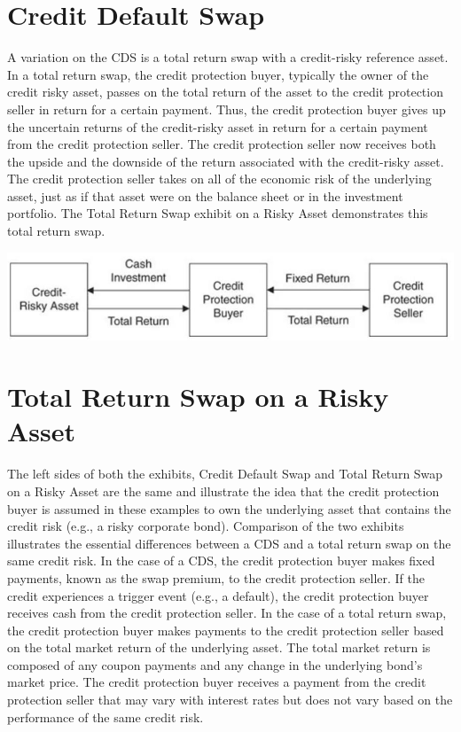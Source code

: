 \documentclass[11pt]{article}
\begin{document}
\section*{Credit Default Swap}
A variation on the CDS is a total return swap with a credit-risky reference asset. In a total return swap, the credit protection buyer, typically the owner of the credit risky asset, passes on the total return of the asset to the credit protection seller in return for a certain payment. Thus, the credit protection buyer gives up the uncertain returns of the credit-risky asset in return for a certain payment from the credit protection seller. The credit protection seller now receives both the upside and the downside of the return associated with the credit-risky asset. The credit protection seller takes on all of the economic risk of the underlying asset, just as if that asset were on the balance sheet or in the investment portfolio. The Total Return Swap exhibit on a Risky Asset demonstrates this total return swap.

\begin{center}
\includegraphics[max width=\textwidth]{2024_04_09_87c8b6247d8feabc3893g-2}
\end{center}

\section*{Total Return Swap on a Risky Asset}
The left sides of both the exhibits, Credit Default Swap and Total Return Swap on a Risky Asset are the same and illustrate the idea that the credit protection buyer is assumed in these examples to own the underlying asset that contains the credit risk (e.g., a risky corporate bond). Comparison of the two exhibits illustrates the essential differences between a CDS and a total return swap on the same credit risk. In the case of a CDS, the credit protection buyer makes fixed payments, known as the swap premium, to the credit protection seller. If the credit experiences a trigger event (e.g., a default), the credit protection buyer receives cash from the credit protection seller. In the case of a total return swap, the credit protection buyer makes payments to the credit protection seller based on the total market return of the underlying asset. The total market return is composed of any coupon payments and any change in the underlying bond's market price. The credit protection buyer receives a payment from the credit protection seller that may vary with interest rates but does not vary based on the performance of the same credit risk.
\end{document}
